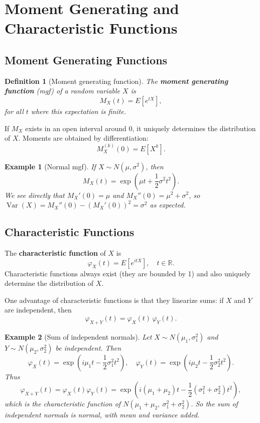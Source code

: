 \documentclass[11pt,a4paper]{article}
\newtheorem{definition}{Definition}[section]
\newtheorem{example}{Example}[section]
\begin{document}
\newpage

\section{Moment Generating and Characteristic Functions}

\subsection{Moment Generating Functions}

\begin{definition}[Moment generating function]
The \textbf{moment generating function} (mgf) of a random variable $X$ is
\[
M_X(t) = E[e^{tX}],
\]
for all $t$ where this expectation is finite.
\end{definition}

If $M_X$ exists in an open interval around 0, it uniquely determines the distribution of $X$. 
Moments are obtained by differentiation:
\[
M_X^{(k)}(0) = E[X^k].
\]

\begin{example}[Normal mgf]
If $X \sim N(\mu,\sigma^2)$, then
\[
M_X(t) = \exp\left(\mu t + \frac{1}{2}\sigma^2 t^2\right).
\]
We see directly that $M_X'(0) = \mu$ and $M_X''(0) = \mu^2 + \sigma^2$, so $\operatorname{Var}(X) = M_X''(0) - (M_X'(0))^2 = \sigma^2$ as expected.

\end{example}

\subsection{Characteristic Functions}

The \textbf{characteristic function} of $X$ is
\[
\varphi_X(t) = E[e^{itX}],\quad t \in \mathbb{R}.
\]
Characteristic functions always exist (they are bounded by 1) and also uniquely determine the distribution of $X$.

One advantage of characteristic functions is that they linearize sums: if $X$ and $Y$ are independent, then
\[
\varphi_{X+Y}(t) = \varphi_X(t)\,\varphi_Y(t).
\]

\begin{example}[Sum of independent normals]
Let $X \sim N(\mu_1,\sigma_1^2)$ and $Y \sim N(\mu_2,\sigma_2^2)$ be independent. 
Then
\[
\varphi_X(t) = \exp\left(i\mu_1 t - \frac{1}{2}\sigma_1^2 t^2\right),\quad
\varphi_Y(t) = \exp\left(i\mu_2 t - \frac{1}{2}\sigma_2^2 t^2\right).
\]
Thus
\[
\varphi_{X+Y}(t) = \varphi_X(t)\varphi_Y(t)
= \exp\left(i(\mu_1+\mu_2)t - \frac{1}{2}(\sigma_1^2+\sigma_2^2)t^2\right),
\]
which is the characteristic function of $N(\mu_1+\mu_2,\ \sigma_1^2+\sigma_2^2)$. 
So the sum of independent normals is normal, with mean and variance added.

\end{example}
\end{document}

